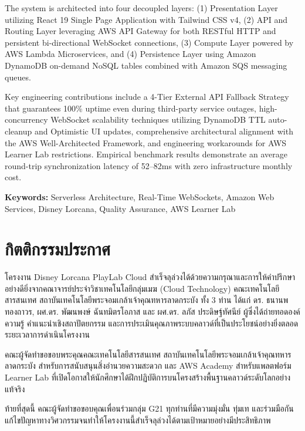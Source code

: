 \documentclass[12pt,a4paper]{report}
\begin{document}
The system is architected into four decoupled layers: (1) Presentation Layer utilizing React 19 Single Page Application with Tailwind CSS v4, (2) API and Routing Layer leveraging AWS API Gateway for both RESTful HTTP and persistent bi-directional WebSocket connections, (3) Compute Layer powered by AWS Lambda Microservices, and (4) Persistence Layer using Amazon DynamoDB on-demand NoSQL tables combined with Amazon SQS messaging queues.

Key engineering contributions include a 4-Tier External API Fallback Strategy that guarantees 100\% uptime even during third-party service outages, high-concurrency WebSocket scalability techniques utilizing DynamoDB TTL auto-cleanup and Optimistic UI updates, comprehensive architectural alignment with the AWS Well-Architected Framework, and engineering workarounds for AWS Learner Lab restrictions. Empirical benchmark results demonstrate an average round-trip synchronization latency of 52--82ms with zero infrastructure monthly cost.

\vspace{0.8cm}
\noindent \textbf{Keywords:} Serverless Architecture, Real-Time WebSockets, Amazon Web Services, Disney Lorcana, Quality Assurance, AWS Learner Lab

\newpage

\chapter*{กิตติกรรมประกาศ}
โครงงาน Disney Lorcana PlayLab Cloud สำเร็จลุล่วงได้ด้วยความกรุณาและการให้คำปรึกษาอย่างดียิ่งจากคณาจารย์ประจำวิชาเทคโนโลยีกลุ่มเมฆ (Cloud Technology) คณะเทคโนโลยีสารสนเทศ สถาบันเทคโนโลยีพระจอมเกล้าเจ้าคุณทหารลาดกระบัง ทั้ง 3 ท่าน ได้แก่ ดร. ธนานพ ทองถาวร, ผศ.ดร. พัฒนพงษ์ ฉันทมิตรโอภาส และ ผศ.ดร. ลภัส ประดิษฐ์ทัศนีย์ ผู้ซึ่งได้ถ่ายทอดองค์ความรู้ คำแนะนำเชิงสถาปัตยกรรม และการประเมินคุณภาพระบบคลาวด์ที่เป็นประโยชน์อย่างยิ่งตลอดระยะเวลาการดำเนินโครงงาน

คณะผู้จัดทำขอขอบพระคุณคณะเทคโนโลยีสารสนเทศ สถาบันเทคโนโลยีพระจอมเกล้าเจ้าคุณทหารลาดกระบัง สำหรับการสนับสนุนสิ่งอำนวยความสะดวก และ AWS Academy สำหรับแพลตฟอร์ม Learner Lab ที่เปิดโอกาสให้นักศึกษาได้ฝึกปฏิบัติการบนโครงสร้างพื้นฐานคลาวด์ระดับโลกอย่างแท้จริง

ท้ายที่สุดนี้ คณะผู้จัดทำขอขอบคุณเพื่อนร่วมกลุ่ม G21 ทุกท่านที่มีความมุ่งมั่น ทุ่มเท และร่วมมือกันแก้ไขปัญหาทางวิศวกรรมจนทำให้โครงงานนี้สำเร็จลุล่วงได้ตามเป้าหมายอย่างมีประสิทธิภาพ
\end{document}
